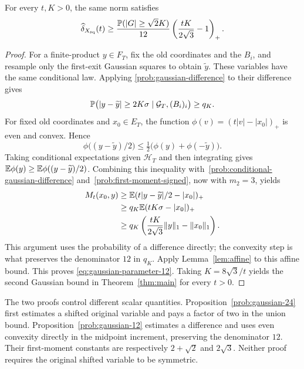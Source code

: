 \begin{proposition}\label{prob:gaussian-12}
For every $t,K>0$, the same norm satisfies
\begin{equation}\label{eq:gaussian-parameter-12}
 \widehat\delta_{X_{\mathrm{sq}}}(t)
 \ge\frac{\mathbb P(|G|\ge\sqrt2K)}{12}
       \left(\frac{tK}{2\sqrt3}-1\right)_+.
\end{equation}
\end{proposition}
\begin{proof}
For a finite-product $y\in F_T$, fix the old coordinates and the $B_i$,
and resample only the first-exit Gaussian squares to obtain $\widetilde y$.
These variables have the same conditional law.  Applying
\eqref{prob:gaussian-difference} to their difference gives
\begin{equation}\label{prob:conditional-gaussian-difference}
 \mathbb P\bigl(|y-\widetilde y|\ge2K\sigma
       \mid\mathcal G_T,(B_i)_i\bigr)\ge q_K.
\end{equation}
For fixed old coordinates and $x_0\in E_T$, the function
$\phi(v)=(t|v|-|x_0|)_+$ is even and convex.  Hence
\[
 \phi\bigl((y-\widetilde y)/2\bigr)
 \le\tfrac12\bigl(\phi(y)+\phi(-\widetilde y)\bigr).
\]
Taking conditional expectations given $\mathcal H_T$ and then integrating gives
$\mathbb E\phi(y)\ge\mathbb E\phi((y-\widetilde y)/2)$.
Combining this inequality with~\eqref{prob:conditional-gaussian-difference}
and~\eqref{prob:first-moment-signed}, now with $m_2=3$, yields
\begin{align}
 M_t(x_0,y)
 &\ge\mathbb E(t|y-\widetilde y|/2-|x_0|)_+\notag\\
 &\ge q_K\mathbb E(tK\sigma-|x_0|)_+\notag\\
 &\ge q_K\left(\frac{tK}{2\sqrt3}\lVert y\rVert_1-\lVert x_0\rVert_1\right).
 \label{prob:gaussian-12-gain}
\end{align}
This argument uses the probability of a difference directly; the convexity
step is what preserves the denominator $12$ in $q_K$.
Apply Lemma~\ref{lem:affine} to this affine bound. This proves
\eqref{eq:gaussian-parameter-12}. Taking $K=8\sqrt3/t$ yields the second
Gaussian bound in Theorem~\ref{thm:main} for every $t>0$.
\end{proof}

The two proofs control different scalar quantities. Proposition~\ref{prob:gaussian-24}
first estimates a shifted original variable and pays a factor of two in
the union bound. Proposition~\ref{prob:gaussian-12} estimates a difference
and uses even convexity directly in the midpoint increment, preserving
the denominator $12$. Their first-moment constants are respectively
$2+\sqrt2$ and $2\sqrt3$. Neither proof requires the original shifted
variable to be symmetric.
